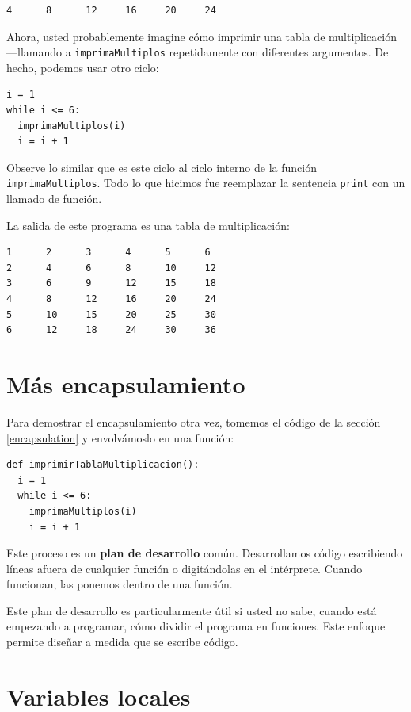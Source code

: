 \beforeverb
\begin{verbatim}
4      8      12     16     20     24
\end{verbatim}
\afterverb
%
Ahora, usted probablemente imagine cómo imprimir una tabla de 
multiplicación ---llamando a \texttt{imprimaMultiplos} repetidamente con
diferentes argumentos.  De hecho, podemos usar otro ciclo:

\beforeverb
\begin{verbatim}
i = 1
while i <= 6:
  imprimaMultiplos(i)
  i = i + 1
\end{verbatim}
\afterverb
%
Observe lo similar que es este ciclo al ciclo interno de la función
\texttt{imprimaMultiplos}.  Todo lo que hicimos fue reemplazar la sentencia
 \texttt{print} con un llamado de función.

La salida de este programa es una tabla de multiplicación:

\beforeverb
\begin{verbatim}
1      2      3      4      5      6
2      4      6      8      10     12
3      6      9      12     15     18
4      8      12     16     20     24
5      10     15     20     25     30
6      12     18     24     30     36
\end{verbatim}
\afterverb
%


\section{Más encapsulamiento}

Para demostrar el encapsulamiento otra vez, tomemos el código de la 
sección \ref{encapsulation} y envolvámoslo en una función:

\beforeverb
\begin{verbatim}
def imprimirTablaMultiplicacion():
  i = 1
  while i <= 6:
    imprimaMultiplos(i)
    i = i + 1
\end{verbatim}
\afterverb
%
Este proceso es un {\bf plan de desarrollo} común.  Desarrollamos
código escribiendo líneas afuera de cualquier función o digitándolas
en el intérprete. Cuando funcionan, las ponemos dentro de una 
función.

Este plan de desarrollo es particularmente útil si usted no sabe,
cuando está empezando a programar, cómo dividir el programa en
funciones. Este enfoque permite diseñar a medida que se escribe
código.


\section{Variables locales}

